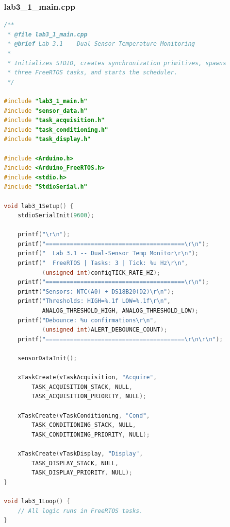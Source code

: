 \subsubsection{lab3\_1\_main.cpp}
\begin{lstlisting}[language=C++, caption=lab3\_1\_main.cpp --- Lab 3.1 Entry Point Implementation]
/**
 * @file lab3_1_main.cpp
 * @brief Lab 3.1 -- Dual-Sensor Temperature Monitoring
 *
 * Initializes STDIO, creates synchronization primitives, spawns
 * three FreeRTOS tasks, and starts the scheduler.
 */

#include "lab3_1_main.h"
#include "sensor_data.h"
#include "task_acquisition.h"
#include "task_conditioning.h"
#include "task_display.h"

#include <Arduino.h>
#include <Arduino_FreeRTOS.h>
#include <stdio.h>
#include "StdioSerial.h"

void lab3_1Setup() {
    stdioSerialInit(9600);

    printf("\r\n");
    printf("========================================\r\n");
    printf("  Lab 3.1 -- Dual-Sensor Temp Monitor\r\n");
    printf("  FreeRTOS | Tasks: 3 | Tick: %u Hz\r\n",
           (unsigned int)configTICK_RATE_HZ);
    printf("========================================\r\n");
    printf("Sensors: NTC(A0) + DS18B20(D2)\r\n");
    printf("Thresholds: HIGH=%.1f LOW=%.1f\r\n",
           ANALOG_THRESHOLD_HIGH, ANALOG_THRESHOLD_LOW);
    printf("Debounce: %u confirmations\r\n",
           (unsigned int)ALERT_DEBOUNCE_COUNT);
    printf("========================================\r\n\r\n");

    sensorDataInit();

    xTaskCreate(vTaskAcquisition, "Acquire",
        TASK_ACQUISITION_STACK, NULL,
        TASK_ACQUISITION_PRIORITY, NULL);

    xTaskCreate(vTaskConditioning, "Cond",
        TASK_CONDITIONING_STACK, NULL,
        TASK_CONDITIONING_PRIORITY, NULL);

    xTaskCreate(vTaskDisplay, "Display",
        TASK_DISPLAY_STACK, NULL,
        TASK_DISPLAY_PRIORITY, NULL);
}

void lab3_1Loop() {
    // All logic runs in FreeRTOS tasks.
}
\end{lstlisting}
